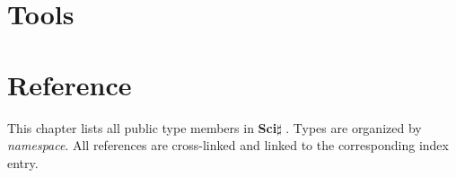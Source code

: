 \documentclass[10pt,a4paper]{report}
\newcommand{\sct}{\textbf{Sci$\sharp$}{ }}
\begin{document}
\chapter{Tools}

\chapter*{Reference}
 
 This chapter lists all public type members in \sct{}. Types
 are organized by \emph{namespace}. All references are cross-linked
 and linked to the corresponding index entry.
 
%   

\newpage
{}

\begin{small}
 \printindex
\end{small}

\end{document}
